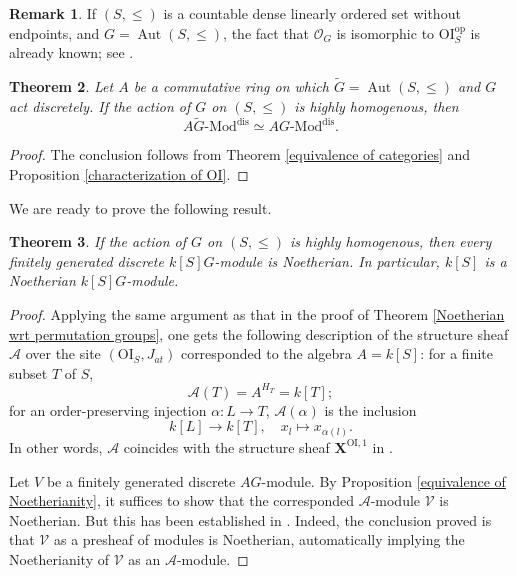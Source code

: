 \documentclass[11pt, reqno]{amsart}
\theoremstyle{plain}
\newtheorem{theorem}{Theorem}[section]
\numberwithin{equation}{section}
\theoremstyle{definition}
\newtheorem{remark}[theorem]{Remark}
\newcommand{\Mod}{{\textrm{-}\mathrm{Mod}}}
\DeclareMathOperator{\Aut}{Aut}
\newcommand{\OI}{{\mathrm{OI}}}
\newcommand{\op}{{\mathrm{op}}}
\newcommand{\dis}{{\mathrm{dis}}}
\begin{document}
\begin{remark}
If $(S, \leqslant)$ is a countable dense linearly ordered set without endpoints, and $G = \Aut(S, \leqslant)$, the fact that $\mathcal{O}_G$ is isomorphic to $\OI_S^{\op}$ is already known; see \cite[Example D.3.4.11]{Jo}.
\end{remark}


\begin{theorem}
Let $A$ be a commutative ring on which $\tilde{G} = \Aut(S, \leqslant)$ and $G$ act discretely. If the action of $G$ on $(S, \leqslant)$ is highly homogenous, then
\[
A \tilde{G} \Mod^{\dis} \simeq AG \Mod^{\dis}.
\]
\end{theorem}

\begin{proof}
The conclusion follows from Theorem \ref{equivalence of categories} and Proposition \ref{characterization of OI}.
\end{proof}

We are ready to prove the following result.

\begin{theorem} \label{Noetherian wrt homogeneous order}
If the action of $G$ on $(S, \leqslant)$ is highly homogenous, then every finitely generated discrete $k[S]G$-module is Noetherian. In particular, $k[S]$ is a Noetherian $k[S]G$-module.
\end{theorem}

\begin{proof}
Applying the same argument as that in the proof of Theorem \ref{Noetherian wrt permutation groups}, one gets the following description of the structure sheaf $\mathcal{A}$ over the site $(\OI_S, J_{at})$ corresponded to the algebra $A = k[S]$: for a finite subset $T$ of $S$,
\[
\mathcal{A}(T) = A^{H_T} = k[T];
\]
for an order-preserving injection $\alpha: L \to T$, $\mathcal{A}(\alpha)$ is the inclusion
\[
k[L] \longrightarrow k[T], \quad x_l \mapsto x_{\alpha(l)}.
\]
In other words, $\mathcal{A}$ coincides with the structure sheaf $\mathbf{X}^{\OI, 1}$ in \cite[Definition 2.17]{NR1}.

Let $V$ be a finitely generated discrete $AG$-module. By Proposition \ref{equivalence of Noetherianity}, it suffices to show that the corresponded $\mathcal{A}$-module $\mathcal{V}$ is Noetherian. But this has been established in \cite[Theorem 6.15]{NR1}. Indeed, the conclusion proved \cite{NR1} is that $\mathcal{V}$ as a presheaf of modules  is Noetherian, automatically implying the Noetherianity of $\mathcal{V}$ as an $\mathcal{A}$-module.
\end{proof}
\end{document}
